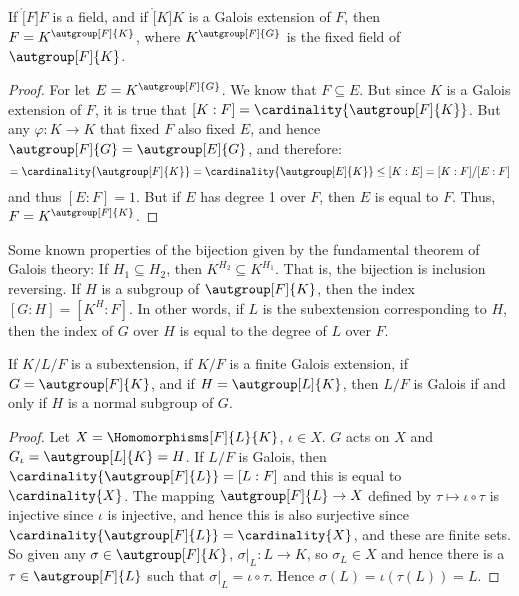 \documentclass{article}                                                        %
\begin{document}
        \begin{theorem}
            If $\ring[F]{F}$ is a field, and if $\ring[K]{K}$ is a Galois
            extension of $F$, then $F=K^{\autgroup[F]{K}}$, where
            $K^{\autgroup[F]{G}}$ is the fixed field of $\autgroup[F]{K}$.
        \end{theorem}
        \begin{proof}
            For let $E=K^{\autgroup[F]{G}}$. We know that $F\subseteq{E}$.
            But since $K$ is a Galois extension of $F$, it is true that
            $[K:F]=\cardinality{\autgroup[F]{K}}$. But any
            $\varphi:K\rightarrow{K}$ that fixed $F$ also fixed $E$, and hence
            $\autgroup[F]{G}=\autgroup[E]{G}$, and therefore:
            \begin{equation}
                [K:F]=\cardinality{\autgroup[F]{K}}
                    =\cardinality{\autgroup[E]{K}}
                    \leq[K:E]=[K:F]/[E:F]
            \end{equation}
            and thus $[E:F]=1$. But if $E$ has degree 1 over $F$, then
            $E$ is equal to $F$. Thus, $F=K^{\autgroup[F]{K}}$.
        \end{proof}
        Some known properties of the bijection given by the fundamental theorem
        of Galois theory: If $H_{1}\subseteq{H}_{2}$, then
        $K^{H_{2}}\subseteq{K}^{H_{1}}$. That is, the bijection is inclusion
        reversing. If $H$ is a subgroup of $\autgroup[F]{K}$, then
        the index $[G:H]=[K^{H}:F]$. In other words, if $L$ is the
        subextension corresponding to $H$, then the index of $G$ over $H$ is
        equal to the degree of $L$ over $F$.
        \begin{theorem}
            If $K/L/F$ is a subextension, if $K/F$ is a finite Galois extension,
            if $G=\autgroup[F]{K}$, and if $H=\autgroup[L]{K}$, then
            $L/F$ is Galois if and only if $H$ is a normal subgroup of $G$.
        \end{theorem}
        \begin{proof}
            Let $X=\Homomorphisms[F]{L}{K}$, $\iota\in{X}$. $G$ acts on $X$ and
            $G_{\iota}=\autgroup[L]{K}=H$. If $L/F$ is Galois, then
            $\cardinality{\autgroup[F]{L}}=[L:F]$ and this is equal to
            $\cardinality{X}$. The mapping $\autgroup[F]{L}\rightarrow{X}$
            defined by $\tau\mapsto\iota\circ\tau$ is injective since $\iota$
            is injective, and hence this is also surjective since
            $\cardinality{\autgroup[F]{L}}=\cardinality{X}$, and these are
            finite sets. So given any $\sigma\in\autgroup[F]{K}$,
            $\sigma|_{L}:L\rightarrow{K}$, so $\sigma_{L}\in{X}$ and hence
            there is a $\tau\in\autgroup[F]{L}$ such that
            $\sigma|_{L}=\iota\circ\tau$. Hence $\sigma(L)=\iota(\tau(L))=L$.
        \end{proof}
\end{document}
